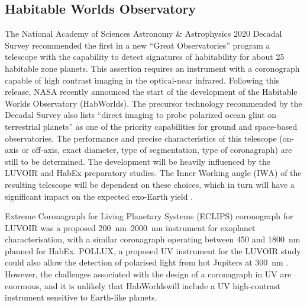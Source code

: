 \documentclass[
    usenatbib,
]{mnras}
\newcommand{\IWA}{\ensuremath{\mathrm{IWA}}}
\newcommand{\hwo}{HabWorlds}
\begin{document}
\subsection{Habitable Worlds Observatory}
The National Academy of Sciences Astronomy \& Astrophysics 2020 Decadal Survey \citep{decadal} recommended the first in a new \enquote{Great Observatories} program a telescope with the capability to detect signatures of habitability for about 25 habitable zone planets.
%
This assertion requires an instrument with a coronograph capable of high contrast imaging in the optical-near infrared.
%
Following this release, NASA recently announced the start of the development of the Habitable Worlds Observatory (\hwo).
%
The precursor technology recommended by the Decadal Survey also lists ``direct imaging to probe polarized ocean glint on terrestrial planets'' as one of the priority capabilities \citep[Box E.1 in][]{decadal} for ground and space-based observatories.
%
The performance and precise characteristics of this telescope (on-axis or off-axis, exact diameter, type of segmentation, type of coronagraph) are still to be determined.
%
The development will be heavily influenced by the LUVOIR \citep{LUVOIR2019} and HabEx \citep{HabEx_2020} preparatory studies.
%
The Inner Working angle (\IWA) of the resulting telescope will be dependent on these choices, which in turn will have a significant impact on the expected exo-Earth yield \citep{Stark2019_exoplanetyield}.

Extreme Coronagraph for Living Planetary Systems (ECLIPS) coronograph for LUVOIR was a proposed \SIrange{200}{2000}{\nano\meter} instrument for exoplanet characterisation, with a similar coronagraph operating between \num{450} and \SI{1800}{\nano\meter} planned for HabEx.
%
POLLUX, a proposed UV instrument for the LUVOIR study could also allow the detection of polarised light from hot Jupiters at \SI{300}{\nano\meter} \citep{Bouret2018_pollux}.
%
However, the challenges associated with the design of a coronagraph in UV are enormous, and it is unlikely that \hwo will include a UV high-contrast instrument sensitive to Earth-like planets.






\end{document}
